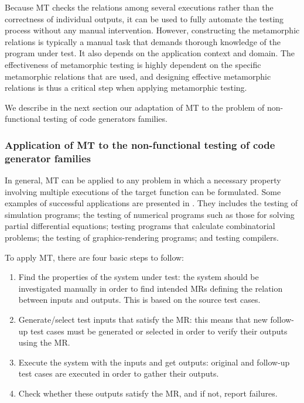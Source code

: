 Because MT checks the relations among several executions rather than the correctness of individual outputs, it can be used to fully automate the testing process without any manual intervention. 
However, constructing the metamorphic relations is typically a manual task that demands thorough knowledge of the program under test. It also depends on the application context and domain. 
The effectiveness of metamorphic testing is highly dependent on the specific metamorphic relations that are used, and designing effective metamorphic relations is thus a critical step when applying metamorphic testing.

We describe in the next section our adaptation of MT to the problem of non-functional testing of code generators families.

\subsubsection{Application of MT to the non-functional testing of code generator families}
In general, MT can be applied to any problem in which a necessary property involving multiple executions of the target function can be formulated. Some examples of successful applications are presented in \cite{zhou2004metamorphic}. They includes the testing of simulation programs; the testing of numerical programs such as those for solving partial differential equations; testing programs that calculate combinatorial problems; the testing of graphics-rendering programs; and testing compilers.

To apply MT, there are four basic steps to follow:

\begin{enumerate}
 \item Find the properties of the system under test: the system should be investigated manually in order to find intended MRs defining the relation between inputs and outputs. This is based on the source test cases.
 \item Generate/select test inputs that satisfy the MR: this means that new follow-up test cases must be generated or selected in order to verify their outputs using the MR.
 \item Execute the system with the inputs and get outputs: original and follow-up test cases are executed in order to gather their outputs.
 \item Check whether these outputs satisfy the MR, and if not, report failures.
\end{enumerate}

